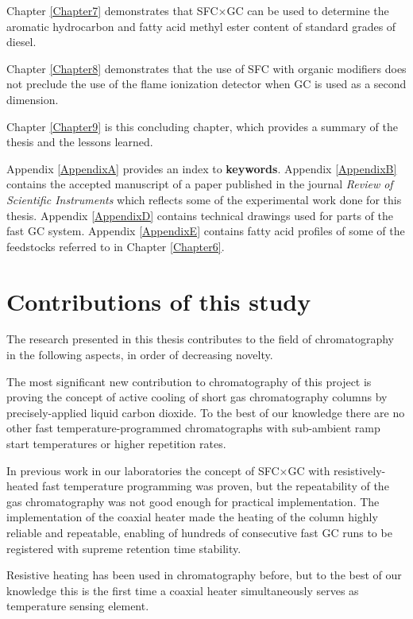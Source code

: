 Chapter \ref{Chapter7} demonstrates that SFC×GC can be used to determine the
aromatic hydrocarbon and fatty acid methyl ester content of standard grades of
diesel. 

Chapter \ref{Chapter8} demonstrates that the use of SFC with organic modifiers
does not preclude the use of the flame ionization detector when GC is used as a
second dimension.

Chapter \ref{Chapter9} is this concluding chapter, which provides a summary of
the thesis and the lessons learned.

Appendix \ref{AppendixA} provides an index to \textbf{keywords}. Appendix
\ref{AppendixB} contains the accepted manuscript of a paper published in the
journal \textit{Review of Scientific Instruments} which reflects some of the
experimental work done for this thesis. Appendix \ref{AppendixD} contains
technical drawings used for parts of the fast GC system. Appendix
\ref{AppendixE} contains fatty acid profiles of some of the feedstocks referred
to in Chapter \ref{Chapter6}.


\section{Contributions of this study}

The research presented in this thesis contributes to the field of chromatography
in the following aspects, in order of decreasing novelty.

The most significant new contribution to chromatography of this project is
proving the concept of active cooling of short gas chromatography columns by
precisely-applied liquid carbon dioxide. To the best of our knowledge there are
no other fast temperature-programmed chromatographs with sub-ambient ramp start
temperatures or higher repetition rates.

In previous work in our laboratories the concept of SFC×GC with
resistively-heated fast temperature programming \autocite{Venter2004,
Venter2006} was proven, but the repeatability of the gas chromatography was not
good enough for practical implementation. The implementation of the coaxial
heater made the heating of the column highly reliable and repeatable, enabling
of hundreds of consecutive fast GC runs to be registered with supreme retention
time stability.

Resistive heating has been used in chromatography before, but to the best of our
knowledge this is the first time a coaxial heater simultaneously serves as
temperature sensing element.

